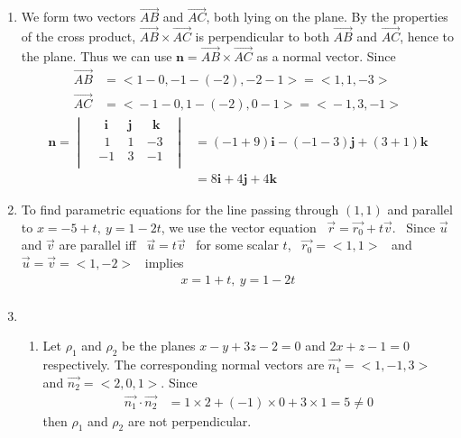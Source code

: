 \documentclass[12pt]{amsart}
\begin{document}
\begin{enumerate}
	\item We form two vectors $\overrightarrow{AB}$ and $\overrightarrow{AC}$, both lying on the plane. By 		the properties of the cross product, $\overrightarrow{AB}\times\overrightarrow{AC}$ is perpendicular 		to both $\overrightarrow{AB}$ and $\overrightarrow{AC}$, hence to the plane. Thus we can use 
		$\mathbf{n}=\overrightarrow{AB}\times\overrightarrow{AC}$ as a normal vector. Since
			\begin{align*}	
				\overrightarrow{AB}&=\big<1-0, -1-(-2), -2-1\big> = \big<1,1, -3\big> \\
				\overrightarrow{AC}&=\big<-1-0, 1-(-2), 0-1\big> = \big<-1, 3, -1\big>
			\end{align*}
			\begin{align*}
				\mathbf{n}=
					\begin{vmatrix}
						& \ \ \mathbf{i} \ &\mathbf{j} \ & \ \ \mathbf{k} \ \ \\
						& \ \ 1 \ &1 \ &-3 \ \ \\
						&-1 \ &3 \ &-1 \ \ \\
					\end{vmatrix} 
					&= (-1+9)\mathbf{i}-(-1-3)\mathbf{j}+(3+1)\mathbf{k} \\
					&=8\mathbf{i}+4\mathbf{j}+4\mathbf{k}
			\end{align*}
			
	\item	 To find parametric equations for the line passing through $(1,1)$ and parallel to 
		$x=-5+t, \ y=1-2t$, we use the vector equation \ $\vec{r}=\vec{r_0}+t\vec{v}$. \ Since $\vec{u}$ and 			$\vec{v}$ are parallel iff \ $\vec{u}=t\vec{v}$ \ for some scalar $t$, \ $\vec{r_0}=\big<1,1\big>$ \ and \ 
		$\vec{u}=\vec{v}=\big<1,-2\big>$ \ implies
			\begin{align*}
			 	x=1+t, \ y=1-2t \\
			\end{align*}
		
	\item
		\begin{enumerate}
		
			\item Let $\rho_1$ and $\rho_2$ be the planes $x-y+3z-2=0$ and $2x+z-1=0$ respectively. 
				The corresponding normal vectors are $\vec{n_1}=\big<1,-1,3\big>$ and $\vec{n_2}=					\big<2,0,1\big>$.  Since 
				\begin{align*}
					\vec{n_1}\cdot\vec{n_2} &= 1\times2+(-1)\times0+3\times1=5\ne0
				\end{align*}
				then $\rho_1$ and $\rho_2$ are not perpendicular.	\\
							

\end{enumerate}
\end{enumerate}
\end{document}
